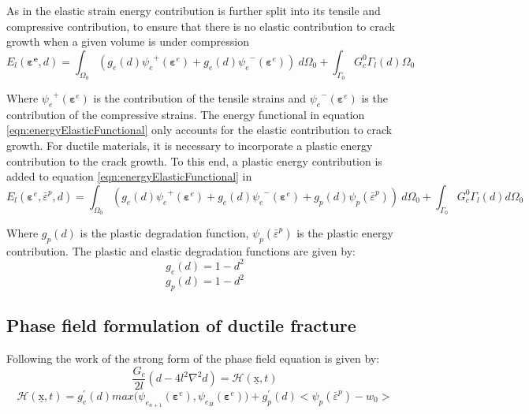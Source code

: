 \documentclass[sn-mathphys,Numbered,draft]{sn-jnl}%
\begin{document}
As in \citet{amor_regularized_2009,miehe_phase_2010-1} the elastic strain energy contribution is further split into its tensile and compressive contribution, to ensure that there is no elastic contribution to crack growth when a given volume is under compression
\begin{equation}
\label{eqn:energyElasticFunctional}
E_l\left(\mathbf{\boldsymbol{\varepsilon}^e},d\right)=\int_{\Omega_0}\left(g_e\left(d\right){\psi_e}^+\left(\boldsymbol{\varepsilon}^e\right)+g_e\left(d\right){\psi_e}^-\left(\boldsymbol{\varepsilon}^e\right)\right)\ d\Omega_0+\int_{\Gamma_0}{G_c^0\Gamma_l\left(d\right)\Omega_0}	
\end{equation}

Where ${\psi_e}^+\left(\boldsymbol{\varepsilon}^e\right)$ is the contribution of the tensile strains and ${\psi_e}^-\left(\boldsymbol{\varepsilon}^e\right)$ is the contribution of the compressive strains. The energy functional in equation \ref{eqn:energyElasticFunctional} only accounts for the elastic contribution to crack growth. For ductile materials, it is necessary to incorporate a plastic energy contribution to the crack growth. To this end, a plastic energy contribution is added to equation \ref{eqn:energyElasticFunctional} in \citet{borden_phase-field_2016}
\begin{equation}
	E_l\left(\boldsymbol{\varepsilon}^e,{\bar{\varepsilon}}^p,d\right)=\int_{\Omega_0}\left(g_e\left(d\right){\psi_e}^+\left(\boldsymbol{\varepsilon}^e\right)+g_e\left(d\right){\psi_e}^-\left(\boldsymbol{\varepsilon}^e\right)+g_p\left(d\right)\psi_p\left({\bar{\varepsilon}}^p\right)\right)\ d\Omega_0+\int_{\Gamma_0}{G_c^0\Gamma_l\left(d\right)d\Omega_0}	
\end{equation}

Where $g_p\left(d\right)$ is the plastic degradation function, $\psi_p\left({\bar{\varepsilon}}^p\right)$ is the plastic energy contribution. 
The plastic and elastic degradation functions are given by:
\begin{equation}
	g_e\left(d\right)=1-d^2	
\end{equation}
\begin{equation}
	g_p\left(d\right)=1-d^2	
\end{equation}

\subsection{Phase field formulation of ductile fracture}
Following the work of \citet{borden_phase-field_2016}  the strong form of the phase field equation is given by:
\begin{equation}
\label{eqn:phaseFieldEquation}
	\frac{G_c}{2l}\left(d-4l^2\nabla^2d\right)=\mathcal{H}\left(\underline{\mathrm{x}},t\right)	
	\end{equation}
\begin{equation}
	\mathcal{H}\left(\underline{\mathrm{x}},t\right)=g_e^\prime\left(d\right)max{(\psi}_{e_{n+1}}\left(\mathbf{\varepsilon}^e\right),\psi_{e_H}\left(\mathbf{\varepsilon}^e\right))+g_p^\prime\left(d\right)<\psi_p({\bar{\varepsilon}}^p)-w_0>
\end{equation}
\end{document}
